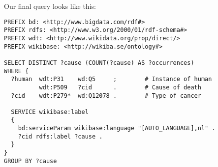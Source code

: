   Our final query looks like this:

\begin{lstlisting}[language=SPARQL]
PREFIX bd: <http://www.bigdata.com/rdf#>
PREFIX rdfs: <http://www.w3.org/2000/01/rdf-schema#>
PREFIX wdt: <http://www.wikidata.org/prop/direct/>
PREFIX wikibase: <http://wikiba.se/ontology#>

SELECT DISTINCT ?cause (COUNT(?cause) AS ?occurrences)
WHERE {
  ?human  wdt:P31    wd:Q5     ;        # Instance of human
          wdt:P509   ?cid      .        # Cause of death
  ?cid    wdt:P279*  wd:Q12078 .        # Type of cancer

  SERVICE wikibase:label
  {
    bd:serviceParam wikibase:language "[AUTO_LANGUAGE],nl" .
    ?cid rdfs:label ?cause .
  }
}
GROUP BY ?cause
\end{lstlisting}
